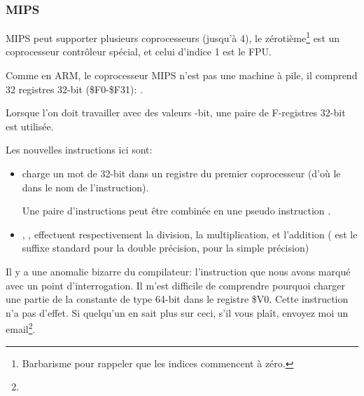 \subsubsection{MIPS}

MIPS peut supporter plusieurs coprocesseurs (jusqu'à 4), le zérotième\footnote{Barbarisme
pour rappeler que les indices commencent à zéro.} est un coprocesseur contrôleur
spécial, et celui d'indice 1 est le FPU.

Comme en ARM, le coprocesseur MIPS n'est pas une machine à pile, il comprend 32 registres
32-bit (\$F0-\$F31):
.

Lorsque l'on doit travailler avec des valeurs -bit, une paire de F-registres
32-bit est utilisée.



Les nouvelles instructions ici sont:

\begin{itemize}

\item {} charge un mot de 32-bit dans un registre du premier coprocesseur
(d'où le  dans le nom de l'instruction).

Une paire d'instructions  peut être combinée en une pseudo instruction .

\item {}, ,  effectuent respectivement la division,
la multiplication, et l'addition ( est le suffixe standard pour la double précision,
 pour la simple précision)

\end{itemize}

\myindex{\CompilerAnomaly}
\label{MIPS_FPU_LUI}

Il y a une anomalie bizarre du compilateur: l'instruction  que nous avons
marqué avec un point d'interrogation.
Il m'est difficile de comprendre pourquoi charger une partie de la constante de type
64-bit \Tdouble dans le registre \$V0. Cette instruction n'a pas d'effet.
Si quelqu'un en sait plus sur ceci, s'il vous plaît, envoyez moi un email\footnote{\EMAILS}.

